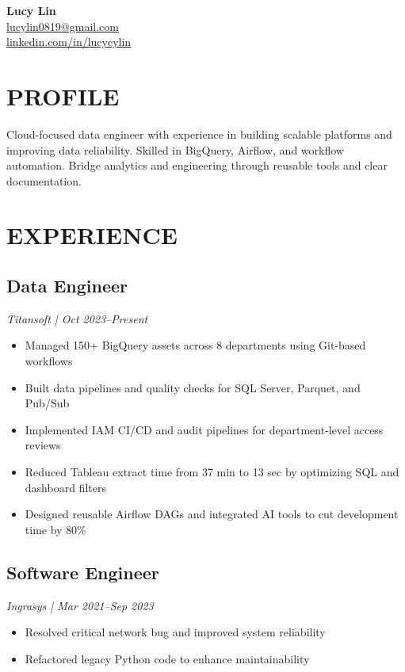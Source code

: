 \documentclass[a4paper,11pt]{article}
\begin{document}
\begin{center}
    {\Huge \textbf{\seriffont Lucy Lin}} \\
    \vspace{0.5em}
     \href{mailto:lucylin0819@gmail.com}{lucylin0819@gmail.com} \\
     \href{https://www.linkedin.com/in/lucycylin/}{linkedin.com/in/lucycylin}
\end{center}

\vspace{0.8em}

\section*{PROFILE}
Cloud-focused data engineer with experience in building scalable platforms and improving data reliability. Skilled in BigQuery, Airflow, and workflow automation. Bridge analytics and engineering through reusable tools and clear documentation.

\section*{EXPERIENCE}

\subsection*{Data Engineer}
\textit{\color{gray}Titansoft | Oct 2023–Present}
\begin{itemize}
    \item Managed 150+ BigQuery assets across 8 departments using Git-based workflows
    \item Built data pipelines and quality checks for SQL Server, Parquet, and Pub/Sub
    \item Implemented IAM CI/CD and audit pipelines for department-level access reviews
    \item Reduced Tableau extract time from 37 min to 13 sec by optimizing SQL and dashboard filters
    \item Designed reusable Airflow DAGs and integrated AI tools to cut development time by 80\%
\end{itemize}

\subsection*{Software Engineer}
\textit{\color{gray}Ingrasys | Mar 2021–Sep 2023}
\begin{itemize}
    \item Resolved critical network bug and improved system reliability
    \item Refactored legacy Python code to enhance maintainability
\end{itemize}
\end{document}
